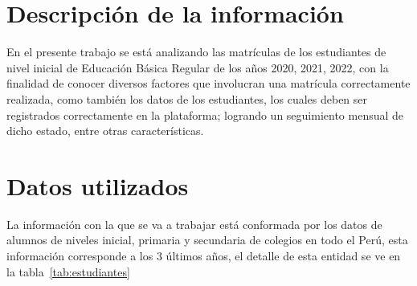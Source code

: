 \section{Descripción de la información}

En el presente trabajo se está analizando las matrículas de los estudiantes de nivel inicial de Educación Básica Regular de los años 2020, 2021, 2022, con la finalidad de conocer diversos factores que involucran una matrícula correctamente realizada, como también los datos de los estudiantes, los cuales deben ser registrados correctamente en la plataforma; logrando un seguimiento mensual de dicho estado, entre otras características.

\section{Datos utilizados}

La información con la que se va a trabajar está conformada por los datos de alumnos de niveles inicial, primaria y secundaria de colegios en todo el Perú, esta información corresponde a los 3 últimos años, el detalle de esta entidad se ve en la tabla~\ref{tab:estudiantes}


